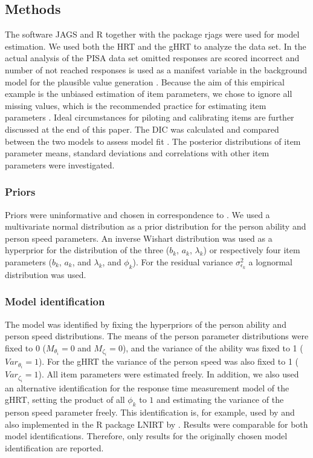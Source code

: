 \documentclass[a4paper,man,apacite,donotrepeattitle]{apa6}
\begin{document}
\subsection{Methods}
The software JAGS \cite{Plummer.jags} and R \cite{R} together with the package rjags \cite{Plummer.rjags} were used for model estimation. We used both the HRT and the gHRT to analyze the data set. In the actual analysis of the PISA data set omitted responses are scored incorrect and number of not reached responses is used as a manifest variable in the background model for the plausible value generation \cite{PISA.2015tech}. Because the aim of this empirical example is the unbiased estimation of item parameters, we chose to ignore all missing values, which is the recommended practice for estimating item parameters \cite{Finch.2008}. Ideal circumstances for piloting and calibrating items are further discussed at the end of this paper. The DIC was calculated and compared between the two models to assess model fit \cite{Spiegelhalter.2002}. The posterior distributions of item parameter means, standard deviations and correlations with other item parameters were investigated. 

\subsubsection{Priors}
Priors were uninformative and chosen in correspondence to . We used a multivariate normal distribution as a prior distribution for the person ability and person speed parameters. An inverse Wishart distribution was used as a hyperprior for the distribution of the three ($b_{k}$, $a_{k}$, $\lambda_{k}$) or respectively four item parameters ($b_{k}$, $a_{k}$, and $\lambda_{k}$, and $\phi_{k}$). For the residual variance $\sigma^2_{\epsilon_{k}}$ a lognormal distribution was used. 

\subsubsection{Model identification}   
The model was identified by fixing the hyperpriors of the person ability and person speed distributions. The means of the person parameter distributions were fixed to 0 ($M_{\theta_{i}} = 0$ and $M_{\zeta_{i}} = 0$), and the variance of the ability was fixed to 1 ($Var_{\theta_{i}} = 1$). For the gHRT the variance of the person speed was also fixed to 1 ($Var_{\zeta_{i}} = 1$). All item parameters were estimated freely. In addition, we also used an alternative identification for the response time measurement model of the gHRT, setting the product of all $\phi_{k}$ to $1$ and estimating the variance of the person speed parameter freely. This identification is, for example, used by  and also implemented in the R package LNIRT by . Results were comparable for both model identifications. Therefore, only results for the originally chosen model identification are reported.
\end{document}
